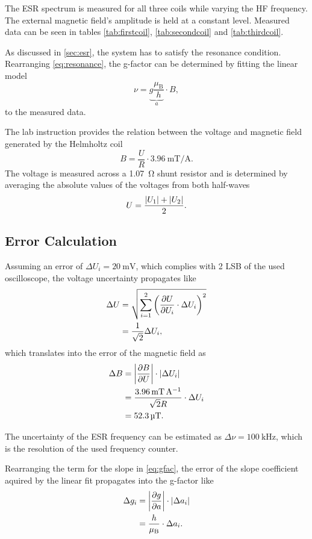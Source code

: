 The ESR spectrum is measured for all three coils while varying the HF frequency.
The external magnetic field's amplitude is held at a constant level.
Measured data can be seen in tables \ref{tab:firstcoil}, \ref{tab:secondcoil} and \ref{tab:thirdcoil}.

As discussed in \autoref{sec:esr}, the system has to satisfy the resonance condition.
Rearranging \autoref{eq:resonance}, the g-factor can be determined by fitting the linear model
\begin{equation}\label{eq:gfac}
	\nu=\underbrace{g\frac{\mu_\text{B}}{h}}_a \cdot B,
\end{equation}
to the measured data.

The lab instruction provides the relation between the voltage and magnetic field generated by the Helmholtz coil
\begin{equation}\label{eq:extfield}
	B=\frac{U}{R}\cdot\SI{3.96}{\milli\tesla\per\ampere}.
\end{equation}
The voltage is measured across a \SI{1.07}{\ohm} shunt resistor and is determined by averaging the absolute values of the voltages from both half-waves
\begin{equation*}
	U = \frac{\left| U_1 \right|+\left| U_2 \right|}{2}.
\end{equation*}

\subsection{Error Calculation}
Assuming an error of $\Delta U_i=\SI{20}{\mV}$, which complies with 2 LSB of the used oscilloscope, the voltage uncertainty propagates like
\begin{alignat*}{2}
	\Delta U &= \sqrt{\sum^2_{i=1}\left(\frac{\partial U}{\partial U_i}\cdot \Delta U_i\right)^2} \\
	&=\frac{1}{\sqrt{2}}\Delta U_i,
\end{alignat*}
which translates into the error of the magnetic field as
\begin{alignat*}{2}
	\Delta B &= \left| \frac{\partial B}{\partial U} \right|\cdot \left| \Delta U_i \right| \\
	&= \frac{\SI{3.96}{\milli\tesla\per\ampere}}{\sqrt{2}R}\cdot\Delta U_i \\
	&= \SI{52.3}{\micro\tesla}.
\end{alignat*}

The uncertainty of the ESR frequency can be estimated as $\Delta\nu = \SI{100}{\kHz}$, which is the resolution of the used frequency counter.

Rearranging the term for the slope in \autoref{eq:gfac}, the error of the slope coefficient aquired by the linear fit propagates into the g-factor like
\begin{alignat*}{2}
	\Delta g_i &= \left| \frac{\partial g}{\partial a} \right|\cdot \left| \Delta a_i \right| \\
	&= \frac{h}{\mu_\text{B}}\cdot\Delta a_i.
\end{alignat*}

